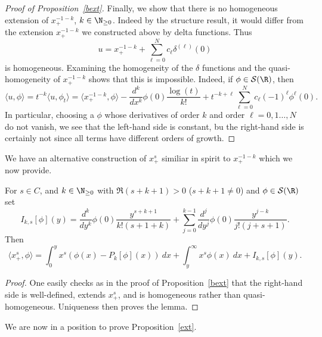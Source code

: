 \documentclass[12pt]{article}
\begin{document}
\begin{proof}[Proof of Proposition~\ref{bext}]
Finally, we show that there is no homogeneous extension of $x_+^{-1-k}$, $k \in \N_{\geq 0}$. Indeed by the structure result, it would differ from the extension $x_+^{-1-k}$ we constructed above by delta functions. Thus
\[u = x_+^{-1-k} + \sum_{\ell=0}^N c_{\ell}\delta^{(\ell)}(0)\] is homogeneous. Examining the homogeneity of the $\delta$ functions and the quasi-homogeneity of $x_+^{-1-k}$ shows that this is impossible. Indeed, if $\phi \in \mathcal S(\R)$, then
\[\langle u,\phi\rangle = t^{-k}\langle u,\phi_t\rangle = \langle x_+^{-1-k},\phi\rangle -\frac{d^k}{dx^k}\phi(0)\frac{\log(t)}{k!} + t^{-k+\ell}\sum_{\ell=0}^N c_\ell (-1)^{\ell}\phi^{\ell}(0).\]
In particular, choosing a $\phi$ whose derivatives of order $k$ and order $\ell=0,1\ldots, N$ do not vanish, we see that the left-hand side is constant, bu the right-hand side is certainly not since all terms have different orders of growth.
\end{proof}

We have an alternative construction of $x_+^s$ similiar in spirit to $x_+^{-1-k}$ which we now provide.
\begin{lem}\label{alt}For $s \in C$, and $k \in \N_{\geq 0}$ with $\Re(s+k+1) > 0$ ($s +k + 1 \neq 0$) and $\phi \in \mathcal S(\R)$ set
\[I_{k,s}[\phi](y) = \frac{d^k}{dy^k}\phi(0)\frac{y^{s+k+1}}{k!(s+1+k)} + \sum_{j=0}^{k-1}\frac{d^j}{dy^j} \phi(0) \frac{y^{j-k}}{j!(j+s+1)}.\]
Then
\[\langle x_+^s,\phi\rangle = \int_0^y x^{s}(\phi(x)-P_k[\phi](x))\ dx + \int_y^\infty x^{s}\phi(x)\ dx + I_{k,s}[\phi](y).\]
\end{lem}
\begin{proof}
One easily checks as in the proof of Proposition~\ref{bext} that the right-hand side is well-defined, extends $x_+^s$, and is homogeneous rather than quasi-homogeneous. Uniqueness then proves the lemma.\end{proof}

We are now in a position to prove Proposition~\ref{ext}.
\end{document}
